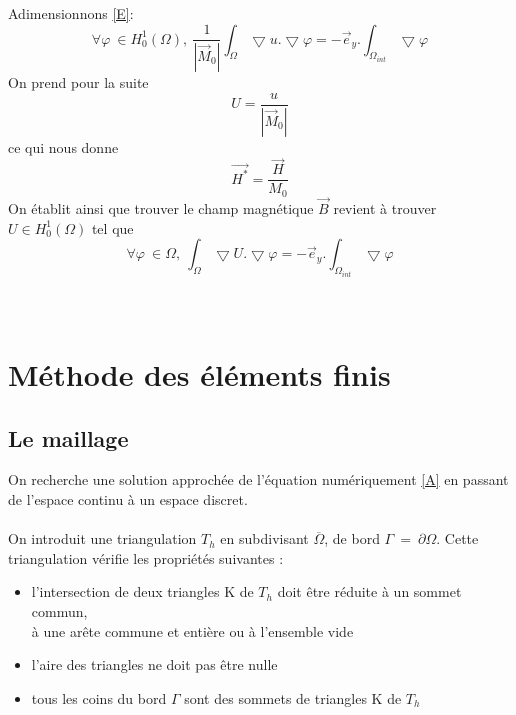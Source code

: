 \documentclass[a4paper,12pt,titlepage]{report}
\begin{document}
\begin{onehalfspace}
Adimensionnons \ref{E}:
\[
	\forall \varphi\  \in H_{0}^{1}(\Omega),\  \frac{1}{|\vec{M}_{0}|}\int_{\Omega}\bigtriangledown u.\bigtriangledown \varphi
	= -\vec{e}_{y}.\int_{\Omega_{int}}\bigtriangledown \varphi
\]
On prend pour la suite \[U =  \frac{u}{|\vec{M}_{0}|}  \] ce qui nous donne \[\vec{H^*} =\frac{\vec{H}}{M_0} \]
On établit ainsi que trouver le champ magnétique $\vec{B}$ revient à trouver $U \in H_{0}^{1}(\Omega)$ tel que
\begin{equation}
\label{A}
\boxed{
	\forall \varphi\  \in \Omega,\ \int_{\Omega}\bigtriangledown U.\bigtriangledown \varphi
	=- \vec{e}_{y}.\int_{\Omega_{int}}\bigtriangledown \varphi}
\end{equation}
\\\
\section{Méthode des éléments finis}

\subsection{Le maillage}
On recherche une solution approchée de l'équation numériquement \ref{A} en passant de l'espace continu à un espace discret. \\
\\
On introduit une triangulation $T_{h}$ en subdivisant $\overline{\Omega}$, de bord $\Gamma \ = \ \partial\Omega$. 
Cette triangulation vérifie les propriétés suivantes :
\\
\begin{itemize}
  \item l’intersection de deux triangles K de $T_{h}$ doit être réduite à un sommet commun,\\ à une arête commune et entière ou à l'ensemble vide
  \item l’aire des triangles ne doit pas être nulle
  \item tous les coins du bord $\Gamma$ sont des sommets de triangles K de $T_{h}$
\end{itemize}


\end{onehalfspace}
\end{document}
